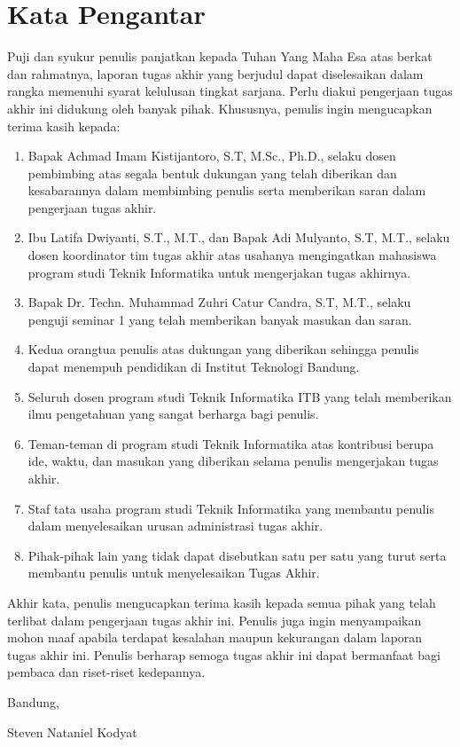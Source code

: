 \chapter*{Kata Pengantar}

Puji dan syukur penulis panjatkan kepada Tuhan Yang Maha Esa atas berkat dan rahmatnya, laporan tugas akhir yang berjudul \thetitle{} dapat diselesaikan dalam rangka memenuhi syarat kelulusan tingkat sarjana. Perlu diakui pengerjaan tugas akhir ini didukung oleh banyak pihak. Khususnya, penulis ingin mengucapkan terima kasih kepada:

\begin{enumerate}
    \item Bapak Achmad Imam Kistijantoro, S.T, M.Sc., Ph.D., selaku dosen pembimbing atas segala bentuk dukungan yang telah diberikan dan kesabarannya dalam membimbing penulis serta memberikan saran dalam pengerjaan tugas akhir.
    \item Ibu Latifa Dwiyanti, S.T., M.T., dan Bapak Adi Mulyanto, S.T, M.T., selaku dosen koordinator tim tugas akhir atas usahanya mengingatkan mahasiswa program studi Teknik Informatika untuk mengerjakan tugas akhirnya.
    \item Bapak Dr. Techn. Muhammad Zuhri Catur Candra, S.T, M.T., selaku penguji seminar 1 yang telah memberikan banyak masukan dan saran.
    \item Kedua orangtua penulis atas dukungan yang diberikan sehingga penulis dapat menempuh pendidikan di Institut Teknologi Bandung.
    \item Seluruh dosen program studi Teknik Informatika ITB yang telah memberikan ilmu pengetahuan yang sangat berharga bagi penulis.
    \item Teman-teman di program studi Teknik Informatika atas kontribusi berupa ide, waktu, dan masukan yang diberikan selama penulis mengerjakan tugas akhir.
    \item Staf tata usaha program studi Teknik Informatika yang membantu penulis dalam menyelesaikan urusan administrasi tugas akhir.
    \item Pihak-pihak lain yang tidak dapat disebutkan satu per satu yang turut serta membantu penulis untuk menyelesaikan Tugas Akhir.
\end{enumerate}

Akhir kata, penulis mengucapkan terima kasih kepada semua pihak yang telah terlibat dalam pengerjaan tugas akhir ini. Penulis juga ingin menyampaikan mohon maaf apabila terdapat kesalahan maupun kekurangan dalam laporan tugas akhir ini. Penulis berharap semoga tugas akhir ini dapat bermanfaat bagi pembaca dan riset-riset kedepannya.

\begin{flushright}
    \vspace{0.5cm}
    Bandung, \tanggalpengesahan


    \vspace{1.5cm}

    Steven Nataniel Kodyat
\end{flushright}